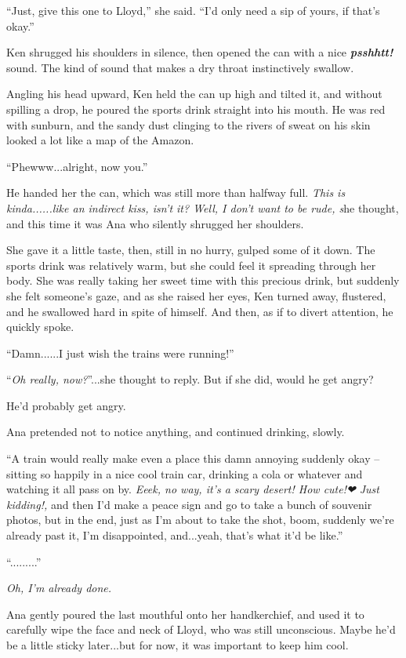 \documentclass[
]{article}
\begin{document}
``Just, give this one to Lloyd,'' she said. ``I'd only need a sip of
yours, if that's okay.''

Ken shrugged his shoulders in silence, then opened the can with a nice
\emph{\textbf{psshhtt!}} sound. The kind of sound that makes a dry
throat instinctively swallow.

Angling his head upward, Ken held the can up high and tilted it, and
without spilling a drop, he poured the sports drink straight into his
mouth. He was red with sunburn, and the sandy dust clinging to the
rivers of sweat on his skin looked a lot like a map of the Amazon.

``Phewww...alright, now you.''

He handed her the can, which was still more than halfway full.
\emph{This is kinda......like an indirect kiss, isn't it? Well, I don't
want to be rude, s}he thought, and this time it was Ana who silently
shrugged her shoulders.

She gave it a little taste, then, still in no hurry, gulped some of it
down. The sports drink was relatively warm, but she could feel it
spreading through her body. She was really taking her sweet time with
this precious drink, but suddenly she felt someone's gaze, and as she
raised her eyes, Ken turned away, flustered, and he swallowed hard in
spite of himself. And then, as if to divert attention, he quickly spoke.

``Damn......I just wish the trains were running!''

``\emph{Oh really, now?}''...she thought to reply. But if she did, would
he get angry?

He'd probably get angry.

Ana pretended not to notice anything, and continued drinking, slowly.

``A train would really make even a place this damn annoying suddenly
okay -- sitting so happily in a nice cool train car, drinking a cola or
whatever and watching it all pass on by. \emph{Eeek, no way, it's a
scary desert! How cute!❤ Just kidding!,} and then I'd make a peace sign
and go to take a bunch of souvenir photos, but in the end, just as I'm
about to take the shot, boom, suddenly we're already past it, I'm
disappointed, and...yeah, that's what it'd be like.''

``.........''

\emph{Oh, I'm already done.}

Ana gently poured the last mouthful onto her handkerchief, and used it
to carefully wipe the face and neck of Lloyd, who was still unconscious.
Maybe he'd be a little sticky later...but for now, it was important to
keep him cool.
\end{document}
